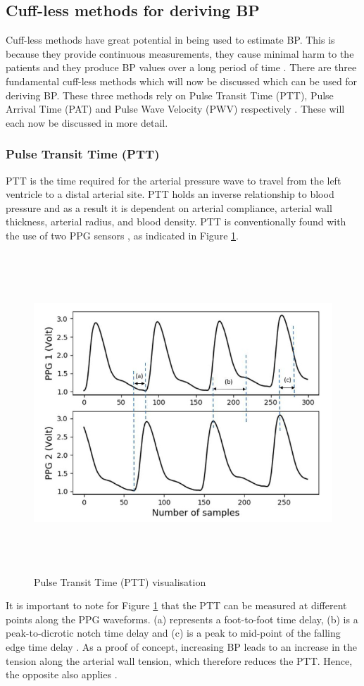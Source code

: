 \subsection{Cuff-less methods for deriving BP} 
Cuff-less  methods have great potential in being used to estimate BP. 
This is because they provide continuous measurements, they cause minimal 
harm to the patients and they produce BP values over a long period of 
time  \cite{Liu2020}. There are three fundamental cuff-less methods 
which will now be discussed which can be used for deriving BP. These 
three methods rely on Pulse Transit Time (PTT), Pulse Arrival 
Time (PAT) and Pulse Wave Velocity (PWV) respectively \cite{Nye2015}. These 
will each now be discussed in more detail.

\subsubsection{Pulse Transit Time (PTT)} 
PTT is the time required for the arterial pressure wave to travel from the 
left ventricle to a distal arterial site. PTT holds an inverse relationship 
to blood pressure and as a result it is dependent on arterial compliance, 
arterial wall thickness, arterial radius, and blood density. PTT is 
conventionally found with the use of two PPG 
sensors \cite{Tanveer2018} \cite{Wang2018} \cite{ElHajj2020}, as indicated 
in Figure \ref{ptt}.
\begin{figure}[H]
    \centering
    \includegraphics[width=12cm,height=12cm,keepaspectratio]{Background/ptt.png}
    \caption{Pulse Transit Time (PTT) visualisation \cite{ElHajj2020}}
    \label{ptt}
\end{figure} \noindent It is important to note for 
Figure \ref{ptt} that the PTT can be measured at different points along 
the PPG waveforms. (a) represents a foot-to-foot time delay, (b) is a 
peak-to-dicrotic notch time delay and (c) is a peak to mid-point of the 
falling edge time delay \cite{ElHajj2020}. As a proof of concept, increasing 
BP leads to an increase in the tension along the arterial wall tension, which 
therefore reduces the PTT. Hence, the opposite also applies \cite{Kumar2015}.

